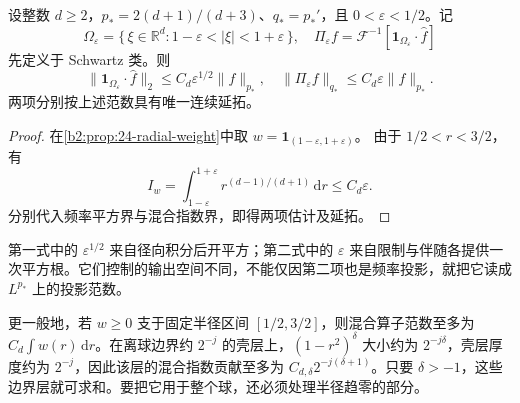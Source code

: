 \begin{corollary}[薄球壳的两种上界]\label{b2:cor:24-thin-shell}
设整数 \(d\geq2\)，\(p_*=2(d+1)/(d+3)\)、\(q_*=p_*'\)，且 \(0<\varepsilon<1/2\)。记
\[
 \Omega_\varepsilon
 =\{\,\xi\in\mathbb R^d:1-\varepsilon<|\xi|<1+\varepsilon\,\},\quad
 \Pi_\varepsilon f
 =\mathcal F^{-1}\!\left[\mathbf1_{\Omega_\varepsilon}\cdot\widehat f\right]
\]
先定义于 Schwartz 类。则
\[
 \|\mathbf1_{\Omega_\varepsilon}\cdot\widehat f\|_2
 \leq C_d\varepsilon^{1/2}\|f\|_{p_*},\quad
 \|\Pi_\varepsilon f\|_{q_*}
 \leq C_d\varepsilon\|f\|_{p_*}.
\]
两项分别按上述范数具有唯一连续延拓。
\end{corollary}
\begin{proof}
在\cref{b2:prop:24-radial-weight}中取
\(w=\mathbf1_{(1-\varepsilon,1+\varepsilon)}\)。
由于 \(1/2<r<3/2\)，有
\[
 I_w=\int_{1-\varepsilon}^{1+\varepsilon}r^{(d-1)/(d+1)}\,\mathrm dr
 \leq C_d\varepsilon.
\]
分别代入频率平方界与混合指数界，即得两项估计及延拓。
\end{proof}

第一式中的 \(\varepsilon^{1/2}\) 来自径向积分后开平方；第二式中的 \(\varepsilon\) 来自限制与伴随各提供一次平方根。它们控制的输出空间不同，不能仅因第二项也是频率投影，就把它读成 \(L^{p_*}\) 上的投影范数。

\ProseParagraphBreak
更一般地，若 \(w\geq0\) 支于固定半径区间 \([1/2,3/2]\)，则混合算子范数至多为
\(C_d\int w(r)\,\mathrm dr\)。在离球边界约 \(2^{-j}\) 的壳层上，\((1-r^2)^\delta\) 大小约为 \(2^{-j\delta}\)，壳层厚度约为 \(2^{-j}\)，因此该层的混合指数贡献至多为
\(C_{d,\delta}2^{-j(\delta+1)}\)。只要 \(\delta>-1\)，这些边界层就可求和。要把它用于整个球，还必须处理半径趋零的部分。

